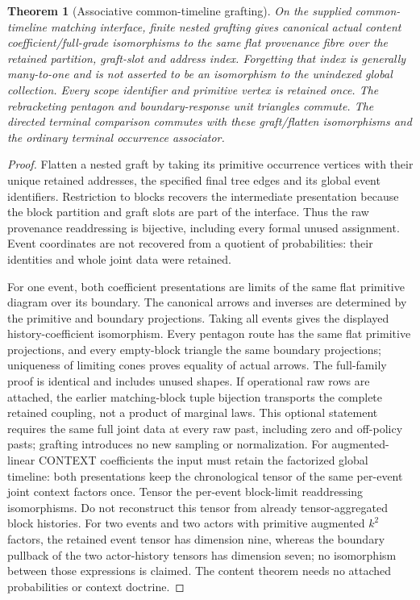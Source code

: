\documentclass[11pt]{article}
\newtheorem{theorem}{Theorem}\newtheorem{proposition}[theorem]{Proposition}
\begin{document}
\begin{theorem}[Associative common-timeline grafting]
On the supplied common-timeline matching interface, finite nested grafting gives canonical actual content coefficient/full-grade isomorphisms to the same flat provenance fibre over the retained partition, graft-slot and address index. Forgetting that index is generally many-to-one and is not asserted to be an isomorphism to the unindexed global collection. Every scope identifier and primitive vertex is retained once. The rebracketing pentagon and boundary-response unit triangles commute. The directed terminal comparison commutes with these graft/flatten isomorphisms and the ordinary terminal occurrence associator.
\end{theorem}
\begin{proof}
Flatten a nested graft by taking its primitive occurrence vertices with their unique retained addresses, the specified final tree edges and its global event identifiers. Restriction to blocks recovers the intermediate presentation because the block partition and graft slots are part of the interface. Thus the raw provenance readdressing is bijective, including every formal unused assignment. Event coordinates are not recovered from a quotient of probabilities: their identities and whole joint data were retained.

For one event, both coefficient presentations are limits of the same flat primitive diagram over its boundary. The canonical arrows and inverses are determined by the primitive and boundary projections. Taking all events gives the displayed history-coefficient isomorphism. Every pentagon route has the same flat primitive projections, and every empty-block triangle the same boundary projections; uniqueness of limiting cones proves equality of actual arrows. The full-family proof is identical and includes unused shapes. If operational raw rows are attached, the earlier matching-block tuple bijection transports the complete retained coupling, not a product of marginal laws. This optional statement requires the same full joint data at every raw past, including zero and off-policy pasts; grafting introduces no new sampling or normalization. For augmented-linear CONTEXT coefficients the input must retain the factorized global timeline: both presentations keep the chronological tensor of the same per-event joint context factors once. Tensor the per-event block-limit readdressing isomorphisms. Do not reconstruct this tensor from already tensor-aggregated block histories. For two events and two actors with primitive augmented $k^2$ factors, the retained event tensor has dimension nine, whereas the boundary pullback of the two actor-history tensors has dimension seven; no isomorphism between those expressions is claimed. The content theorem needs no attached probabilities or context doctrine.


\end{proof}
\end{document}
